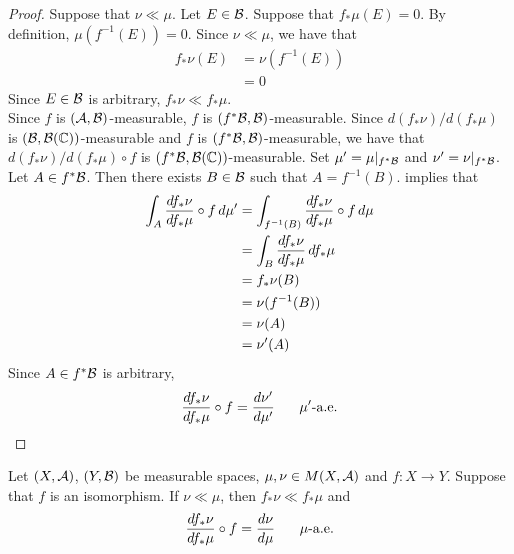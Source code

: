\documentclass{book}
\begin{document}
	\begin{proof}
		Suppose that $\nu \ll \mu$. Let $E \in \mathcal{B}$. Suppose that $f_*\mu(E) = 0$. By definition, $\mu(f^{-1}(E)) = 0$. Since $\nu \ll \mu$, we have that 
		\begin{align*}
			f_*\nu(E)
			& = \nu(f^{-1}(E)) \\
			& = 0
		\end{align*}
		Since $E \in \mathcal{B}$ is arbitrary, $f_*\nu \ll f_*\mu$. \\
		Since $f$ is $(\mathcal{A}, \mathcal{B})$-measurable, $f$ is $(f^*\mathcal{B}, \mathcal{B})$-measurable. Since $d(f_*\nu)/d(f_*\mu)$ is $(\mathcal{B}, \mathcal{B}(\mathbb{C}))$-measurable and $f$ is $(f^*\mathcal{B}, \mathcal{B})$-measurable, we have that $d(f_*\nu)/d(f_*\mu) \circ f$ is $(f^*\mathcal{B}, \mathcal{B}(\mathbb{C}))$-measurable. Set $\mu' = \mu|_{f^*\mathcal{B}}$ and $\nu' = \nu|_{f^*\mathcal{B}}$. Let $A \in f^*\mathcal{B}$. Then there exists $B \in \mathcal{B}$ such that $A = f^{-1}(B)$.  implies that  
		\begin{align*}
			\int_A \frac{d f_* \nu}{d f_* \mu} \circ f \, d \mu' 
			& = \int_{f^{-1}(B)} \frac{d f_* \nu}{d f_* \mu} \circ f \, d \mu \\
			& = \int_B \frac{d f_* \nu}{d f_* \mu} \, d f_* \mu \\
			& = f_* \nu(B) \\
			& = \nu(f^{-1}(B)) \\
			& = \nu(A) \\
			& = \nu'(A)
		\end{align*}
		Since $A \in f^*\mathcal{B}$ is arbitrary, 
		$$\frac{d f_* \nu}{d f_* \mu} \circ f = \frac{d\nu'}{d\mu'} \hspace{.5cm} \text{ $\mu'$-a.e.}$$
	\end{proof}
	
	\begin{ex} 
		Let $(X, \mathcal{A})$, $(Y, \mathcal{B})$ be measurable spaces, $\mu, \nu \in M(X, \mathcal{A})$ and $f: X \rightarrow Y$. Suppose that $f$ is an isomorphism. If $\nu \ll \mu$, then $f_*\nu \ll f_*\mu$ and 
		$$\frac{d f_*\nu}{d f_*\mu} \circ f = \frac{d\nu}{d \mu}  \hspace{.5cm} \text{ $\mu$-a.e.}$$ 
	\end{ex}
\end{document}
